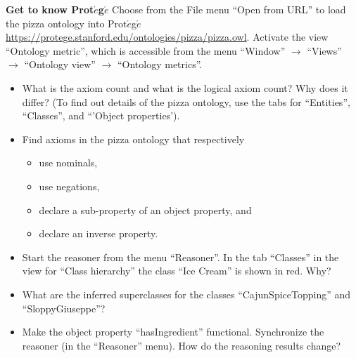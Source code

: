 \documentclass[12pt,a4paper]{article}
\newenvironment{problem}[2][{\color{red}Question}]{\begin{trivlist}
\item[\hskip \labelsep {\bfseries #1}\hskip \labelsep {\bfseries #2.}]}{\end{trivlist}}
\begin{document}
\begin{problem}{{\color{red}9}}
\textbf{Get to know Prot$\acute{e}$g$\acute{e}$}
Choose from the File menu ``Open from URL'' to load the pizza ontology into Prot$\acute{e}$g$\acute{e}$ \url{https://protege.stanford.edu/ontologies/pizza/pizza.owl}. Activate the view ``Ontology metric'', which is accessible from the menu ``Window'' $\rightarrow$ ``Views'' $\rightarrow$ ``Ontology view'' $\rightarrow$ ``Ontology metrics''.
\begin{itemize}
    \item What is the axiom count and what is the logical axiom count? Why does it differ? (To find out details of the pizza ontology, use the tabs for ``Entities'', ``Classes'', and ``'Object properties').
    \item Find axioms in the pizza ontology that respectively
    \begin{itemize}
        \item use nominals,
        \item use negations,
        \item declare a sub-property of an object property, and
        \item declare an inverse property.
    \end{itemize}
    \item Start the reasoner from the menu ``Reasoner''. In the tab ``Classes'' in the view for ``Class hierarchy'' the class ``Ice Cream'' is shown in red. Why?
    \item What are the inferred superclasses for the classes ``CajunSpiceTopping'' and ``SloppyGiuseppe''?
    \item Make the object property ``hasIngredient'' functional. Synchronize the reasoner (in the ``Reasoner'' menu). How do the reasoning results change? 
\end{itemize}
\end{problem}
\end{document}
